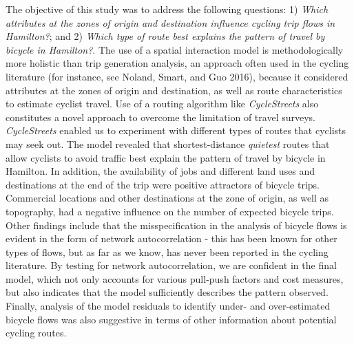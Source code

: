\documentclass[smallextended]{svjour3}       %
\begin{document}
The objective of this study was to address the following questions: 1)
\emph{Which attributes at the zones of origin and destination influence
cycling trip flows in Hamilton?}; and 2) \emph{Which type of route best
explains the pattern of travel by bicycle in Hamilton?}. The use of a
spatial interaction model is methodologically more holistic than trip
generation analysis, an approach often used in the cycling literature
(for instance, see Noland, Smart, and Guo 2016), because it considered
attributes at the zones of origin and destination, as well as route
characteristics to estimate cyclist travel. Use of a routing algorithm
like \emph{CycleStreets} also constitutes a novel approach to overcome
the limitation of travel surveys. \emph{CycleStreets} enabled us to
experiment with different types of routes that cyclists may seek out.
The model revealed that shortest-distance \emph{quietest} routes that
allow cyclists to avoid traffic best explain the pattern of travel by
bicycle in Hamilton. In addition, the availability of jobs and different
land uses and destinations at the end of the trip were positive
attractors of bicycle trips. Commercial locations and other destinations
at the zone of origin, as well as topography, had a negative influence
on the number of expected bicycle trips. Other findings include that the
misspecification in the analysis of bicycle flows is evident in the form
of network autocorrelation - this has been known for other types of
flows, but as far as we know, has never been reported in the cycling
literature. By testing for network autocorrelation, we are confident in
the final model, which not only accounts for various pull-push factors
and cost measures, but also indicates that the model sufficiently
describes the pattern observed. Finally, analysis of the model residuals
to identify under- and over-estimated bicycle flows was also suggestive
in terms of other information about potential cycling routes.
\end{document}
